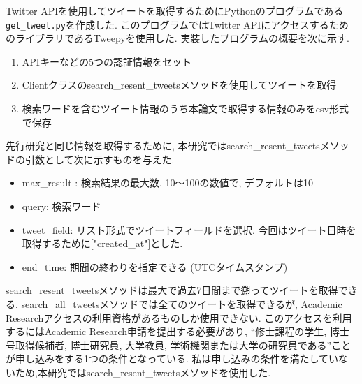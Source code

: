 Twitter APIを使用してツイートを取得するためにPythonのプログラムである\verb|get_tweet.py|を作成した. このプログラムではTwitter APIにアクセスするためのライブラリであるTweepy\cite{tweepy}を使用した. 
実装したプログラムの概要を次に示す.
\begin{enumerate}
  \item APIキーなどの5つの認証情報をセット
  \item Clientクラスのsearch\_resent\_tweetsメソッドを使用してツイートを取得
  \item 検索ワードを含むツイート情報のうち本論文で取得する情報のみをcsv形式で保存
\end{enumerate}
先行研究と同じ情報を取得するために, 本研究ではsearch\_resent\_tweetsメソッドの引数として次に示すものを与えた. 
\begin{itemize}
 \item max\_result : 検索結果の最大数. 10〜100の数値で, デフォルトは10
 \item query: 検索ワード
 \item tweet\_field: リスト形式でツイートフィールドを選択. 今回はツイート日時を取得するために["created\_at"]とした. 
 \item end\_time: 期間の終わりを指定できる (UTCタイムスタンプ) 
\end{itemize}
search\_resent\_tweetsメソッドは最大で過去7日間まで遡ってツイートを取得できる. search\_all\_tweetsメソッドでは全てのツイートを取得できるが, Academic Researchアクセスの利用資格があるものしか使用できない. このアクセスを利用するにはAcademic Research申請を提出する必要があり, ``修士課程の学生, 博士号取得候補者, 博士研究員, 大学教員, 学術機関または大学の研究員である''ことが申し込みをする1つの条件となっている\cite{academic-research}. 
私は申し込みの条件を満たしていないため,本研究ではsearch\_resent\_tweetsメソッドを使用した. 


